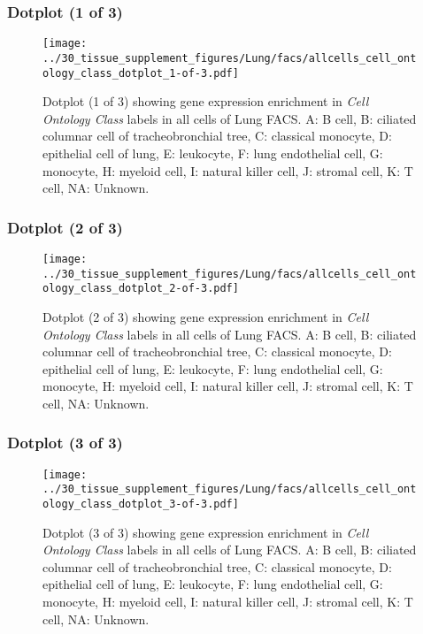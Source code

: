 \clearpage

\subsubsection{Dotplot (1 of 3)}
\begin{figure}[h]
\centering
\texttt{[image: ../30\_tissue\_supplement\_figures/Lung/facs/allcells\_cell\_ontology\_class\_dotplot\_1-of-3.pdf]}

\caption{ Dotplot (1 of 3)  showing gene expression enrichment in \emph{Cell Ontology Class} labels in all cells of Lung FACS. A: B cell, B: ciliated columnar cell of tracheobronchial tree, C: classical monocyte, D: epithelial cell of lung, E: leukocyte, F: lung endothelial cell, G: monocyte, H: myeloid cell, I: natural killer cell, J: stromal cell, K: T cell, NA: Unknown.}
\end{figure}


\clearpage

\subsubsection{Dotplot (2 of 3)}
\begin{figure}[h]
\centering
\texttt{[image: ../30\_tissue\_supplement\_figures/Lung/facs/allcells\_cell\_ontology\_class\_dotplot\_2-of-3.pdf]}

\caption{ Dotplot (2 of 3)  showing gene expression enrichment in \emph{Cell Ontology Class} labels in all cells of Lung FACS. A: B cell, B: ciliated columnar cell of tracheobronchial tree, C: classical monocyte, D: epithelial cell of lung, E: leukocyte, F: lung endothelial cell, G: monocyte, H: myeloid cell, I: natural killer cell, J: stromal cell, K: T cell, NA: Unknown.}
\end{figure}


\clearpage

\subsubsection{Dotplot (3 of 3)}
\begin{figure}[h]
\centering
\texttt{[image: ../30\_tissue\_supplement\_figures/Lung/facs/allcells\_cell\_ontology\_class\_dotplot\_3-of-3.pdf]}

\caption{ Dotplot (3 of 3)  showing gene expression enrichment in \emph{Cell Ontology Class} labels in all cells of Lung FACS. A: B cell, B: ciliated columnar cell of tracheobronchial tree, C: classical monocyte, D: epithelial cell of lung, E: leukocyte, F: lung endothelial cell, G: monocyte, H: myeloid cell, I: natural killer cell, J: stromal cell, K: T cell, NA: Unknown.}
\end{figure}



